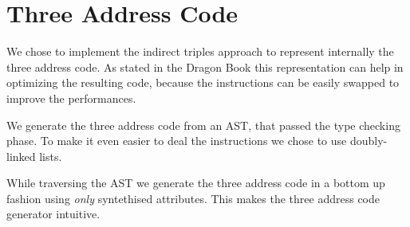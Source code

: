 \section{Three Address Code}
We chose to implement the indirect triples approach to represent internally
the three address code. As stated in the Dragon Book \cite{dragonbook} this 
representation
can help in optimizing the resulting code, because the instructions can be
easily swapped to improve the performances.

We generate the three address code from an AST, that passed the type checking
phase. To make it even easier to deal the instructions we chose to use
doubly-linked lists.

While traversing the AST we generate the three address code in a bottom up
fashion using \emph{only} syntethised attributes. This makes the three address
code generator intuitive.


